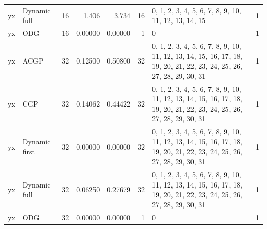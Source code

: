 \documentclass[10pt,a4paper]{article}
\begin{document}
\begin{longtable}{@{}p{23mm}p{29mm}rrrrp{36mm}r@{}}
yx & Dynamic full & 16 & 1.406 & 3.734 & 16 & 0, 1, 2, 3, 4, 5, 6, 7, 8, 9, 10, 11, 12, 13, 14, 15 & 1 \\
yx & ODG & 16 & 0.00000 & 0.00000 & 1 & 0 & 1 \\
yx & ACGP & 32 & 0.12500 & 0.50800 & 32 & 0, 1, 2, 3, 4, 5, 6, 7, 8, 9, 10, 11, 12, 13, 14, 15, 16, 17, 18, 19, 20, 21, 22, 23, 24, 25, 26, 27, 28, 29, 30, 31 & 1 \\
yx & CGP & 32 & 0.14062 & 0.44422 & 32 & 0, 1, 2, 3, 4, 5, 6, 7, 8, 9, 10, 11, 12, 13, 14, 15, 16, 17, 18, 19, 20, 21, 22, 23, 24, 25, 26, 27, 28, 29, 30, 31 & 1 \\
yx & Dynamic first & 32 & 0.00000 & 0.00000 & 32 & 0, 1, 2, 3, 4, 5, 6, 7, 8, 9, 10, 11, 12, 13, 14, 15, 16, 17, 18, 19, 20, 21, 22, 23, 24, 25, 26, 27, 28, 29, 30, 31 & 1 \\
yx & Dynamic full & 32 & 0.06250 & 0.27679 & 32 & 0, 1, 2, 3, 4, 5, 6, 7, 8, 9, 10, 11, 12, 13, 14, 15, 16, 17, 18, 19, 20, 21, 22, 23, 24, 25, 26, 27, 28, 29, 30, 31 & 1 \\
yx & ODG & 32 & 0.00000 & 0.00000 & 1 & 0 & 1 \\
\end{longtable}\normalsize\setlength{\tabcolsep}{6pt}
\clearpage
\end{document}
